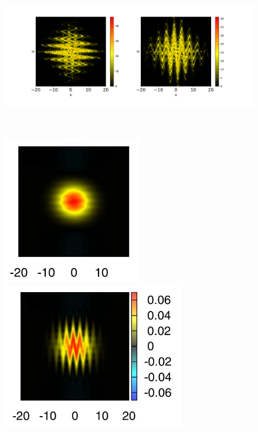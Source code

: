 \documentclass[letterpaper,12pt,oneside]{book}
\begin{document}
\begin{figure}
	\centering
	\hspace{0.2cm}
	\begin{minipage}{0.9\textwidth}
		\centering
		\includegraphics[width=16.1cm]{Figs/CalorMapk45T0.pdf}
		
	\end{minipage}\\
	\begin{minipage}{0.45\textwidth}
		\hspace{1.2cm}
		\includegraphics[width=6cm]{Figures/WignerFunctions1}
		
		
	\end{minipage}
	\begin{minipage}{0.45\textwidth}
		\hspace{0cm}
		\includegraphics[width=7.99cm]{Figures/WignerFunctions2}
		

\end{minipage}
\end{figure}
\end{document}
